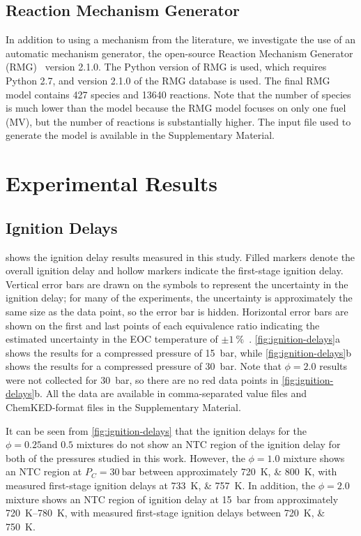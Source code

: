 \documentclass[letterpaper, review]{elsarticle}
\begin{document}
\subsection{Reaction Mechanism Generator}\label{sec:reaction-mechanism-generator}

In addition to using a mechanism from the literature, we investigate the use of an automatic
mechanism generator, the open-source Reaction Mechanism Generator (RMG)~\cite{Allen2012} version
2.1.0. The Python version of RMG is used, which requires Python 2.7, and version 2.1.0 of the RMG
database is used. The final RMG model contains 427 species and 13640 reactions. Note that the number
of species is much lower than the \citet{Dievart2013} model because the RMG model focuses on only
one fuel (MV), but the number of reactions is substantially higher. The input file used to generate
the model is available in the Supplementary Material.

\section{Experimental Results}\label{sec:experimental-results}
\subsection{Ignition Delays}\label{sec:ignition-delays}

 shows the ignition delay results measured in this study. Filled markers
denote the overall ignition delay and hollow markers indicate the first-stage ignition delay.
Vertical error bars are drawn on the symbols to represent the uncertainty in the ignition delay; for
many of the experiments, the uncertainty is approximately the same size as the data point, so the
error bar is hidden. Horizontal error bars are shown on the first and last points of each
equivalence ratio indicating the estimated uncertainty in the EOC temperature of
$\pm\SI{1}{\percent}$~\cite{Weber2015}. \cref{fig:ignition-delays}a shows the results for a
compressed pressure of \SI{15}{\bar}, while \cref{fig:ignition-delays}b shows the results for a
compressed pressure of \SI{30}{\bar}. Note that $\phi=2.0$ results were not collected for
\SI{30}{\bar}, so there are no red data points in \cref{fig:ignition-delays}b. All the data are
available in comma-separated value files and ChemKED-format \cite{Weber2017} files in the
Supplementary Material.

It can be seen from \cref{fig:ignition-delays} that the ignition delays for the \(\phi=0.25\text{
and } 0.5\) mixtures do not show an NTC region of the ignition delay for both of the pressures
studied in this work. However, the \(\phi=1.0\) mixture shows an NTC region at
\(P_C=\SI[number-unit-product={\ }]{30}{\bar}\) between approximately \SIlist{720;800}{\K}, with
measured first-stage ignition delays at \SIlist{733;757}{\K}. In addition, the \(\phi=2.0\) mixture
shows an NTC region of ignition delay at \SI{15}{\bar} from approximately \SIrange{720}{780}{\K},
with measured first-stage ignition delays between \SIlist{720;750}{\K}.
\end{document}
